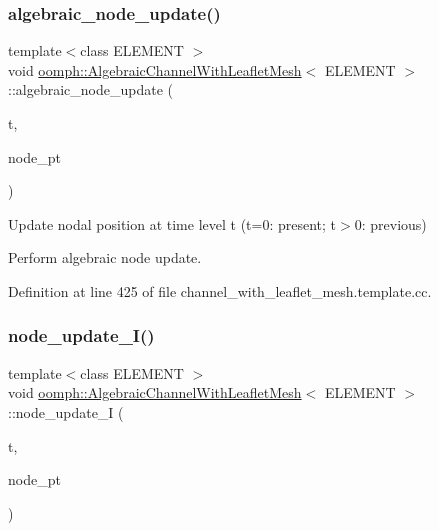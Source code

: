 \subsubsection{\texorpdfstring{algebraic\+\_\+node\+\_\+update()}{algebraic\_node\_update()}}
{\footnotesize\ttfamily template$<$class E\+L\+E\+M\+E\+NT $>$ \\
void \hyperlink{classoomph_1_1AlgebraicChannelWithLeafletMesh}{oomph\+::\+Algebraic\+Channel\+With\+Leaflet\+Mesh}$<$ E\+L\+E\+M\+E\+NT $>$\+::algebraic\+\_\+node\+\_\+update (\begin{DoxyParamCaption}\item[{const unsigned \&}]{t,  }\item[{Algebraic\+Node $\ast$\&}]{node\+\_\+pt }\end{DoxyParamCaption})}



Update nodal position at time level t (t=0\+: present; t$>$0\+: previous) 

Perform algebraic node update. 

Definition at line 425 of file channel\+\_\+with\+\_\+leaflet\+\_\+mesh.\+template.\+cc.

\mbox{\label{classoomph_1_1AlgebraicChannelWithLeafletMesh_a53de0d31556bc78e22b5c06bb66bdd73}} 
\subsubsection{\texorpdfstring{node\+\_\+update\+\_\+\+I()}{node\_update\_I()}}
{\footnotesize\ttfamily template$<$class E\+L\+E\+M\+E\+NT $>$ \\
void \hyperlink{classoomph_1_1AlgebraicChannelWithLeafletMesh}{oomph\+::\+Algebraic\+Channel\+With\+Leaflet\+Mesh}$<$ E\+L\+E\+M\+E\+NT $>$\+::node\+\_\+update\+\_\+I (\begin{DoxyParamCaption}\item[{const unsigned \&}]{t,  }\item[{Algebraic\+Node $\ast$\&}]{node\+\_\+pt }\end{DoxyParamCaption})\hspace{0.3cm}{\ttfamily [protected]}}




